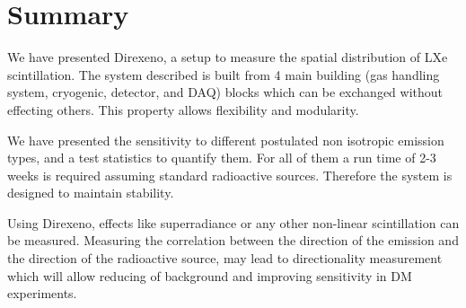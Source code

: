\section{Summary}
\label{sec:summary}

We have presented Direxeno, a setup to measure the spatial distribution of LXe scintillation. The system described is built from 4 main building (gas handling system, cryogenic, detector, and DAQ) blocks which can be exchanged without effecting others. This property allows flexibility and modularity.

We have presented the sensitivity to different postulated non isotropic emission types, and a test statistics to quantify them. For all of them a run time of 2-3 weeks is required assuming standard radioactive sources. Therefore the system is designed to maintain stability.

Using Direxeno, effects like superradiance or any other non-linear scintillation can be measured. Measuring the correlation between the direction of the emission and the direction of the radioactive source, may lead to directionality measurement which will allow reducing of background and improving sensitivity in DM experiments.
